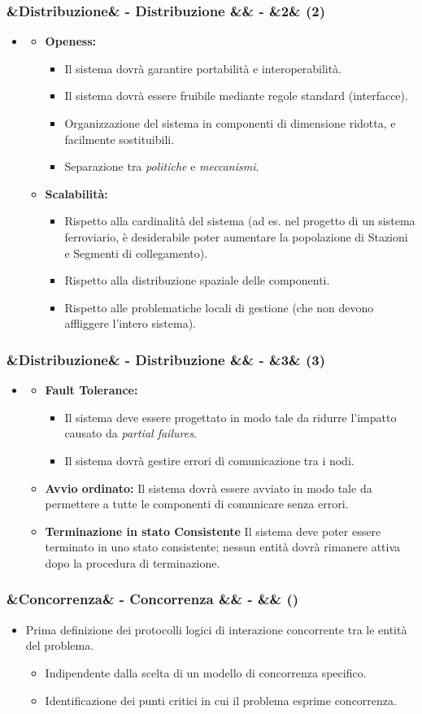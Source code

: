 \documentclass[slidestop,compress,blackandwhite]{beamer}
\newcommand{\itemB}[3]{
	\item \textbf{#1} #2 \vspace{#3}
}
\newcommand{\ii}[1]{\textit{#1}}
\newcommand{\cm}[1]{\vspace{#1cm}}
\newcommand{\newtitle}[4]{
	#1 
	\ifx&#2&%
	\else
  		\large- #2
	\fi
	\ifx&#3&%
	\else
  		\normalsize- #3
	\fi
	\ifx&#4&%
	\else
  		\normalsize (#4)
	\fi
}
\newcommand{\newframe}[5]{
	\begin{frame}
		\frametitle{\newtitle{#1}{#2}{#3}{#4}}
		#5
	\end{frame}
}
\newcommand{\myitemize}[1]{
	\begin{itemize}\itemsep4pt
	#1
	\end{itemize}
}
\begin{document}
	\newframe{}{Distribuzione}{}{2}{
		\myitemize {
			\item[]
				\myitemize {
					\itemB{Openess:}{\justifying
						\myitemize {
							\item Il sistema dovrà garantire portabilità e interoperabilità.
							\item Il sistema dovrà essere fruibile mediante regole standard (interfacce).
							\item \justifying Organizzazione del sistema in componenti di dimensione ridotta, e facilmente sostituibili.
							\item Separazione tra \ii{politiche} e \ii{meccanismi}.
						}
					}{0.1cm}
					\itemB{Scalabilità:}{\justifying
						\myitemize {
							\item Rispetto alla cardinalità del sistema (ad es. nel progetto di un sistema ferroviario, è desiderabile poter aumentare la popolazione di Stazioni e Segmenti di collegamento).
							\item Rispetto alla distribuzione spaziale delle componenti.
							\item Rispetto alle problematiche locali di gestione (che non devono affliggere l'intero sistema).
						}
					}{0.1cm}
				}
		}
	}
	
	\newframe{}{Distribuzione}{}{3}{
		\cm{0.5}
		\myitemize {
			\item[]
				\myitemize {
					\itemB{Fault Tolerance:}{
						\myitemize{
							\item Il sistema deve essere progettato in modo tale da ridurre l'impatto causato da \ii{partial failures}.
							\item Il sistema dovrà gestire errori di comunicazione tra i nodi.
						}
					}{0.1cm}
					
					\itemB{Avvio ordinato:}{\justifying Il sistema dovrà essere avviato in modo tale da permettere a tutte le componenti di comunicare senza errori.}{0.1cm}
					\itemB{Terminazione in stato Consistente}{\justifying Il sistema deve poter essere terminato in uno stato consistente; nessun entità dovrà rimanere attiva dopo la procedura di terminazione.}{0.1cm}
				}
				
		}
	}


	
	\newframe{}{Concorrenza}{}{}{
		\cm{0.5}
		\myitemize {
			\item Prima definizione dei protocolli logici di interazione concorrente tra le entità del problema.
				\cm{0.4}
				\myitemize {
					\item Indipendente dalla scelta di un modello di concorrenza specifico.
					\cm{0.3}
					\item Identificazione dei punti critici in cui il problema esprime concorrenza.
				}
		}
		
	}
	
\end{document}
